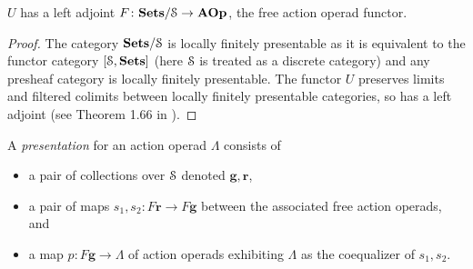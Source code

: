 \begin{cor}
$U$ has a left adjoint $F \colon \mathbf{Sets}/\mathcal{S} \rightarrow \mathbf{AOp}$, the free action operad functor.
\end{cor}
\begin{proof}
The category $\mathbf{Sets}/\mathcal{S}$ is locally finitely presentable as it is equivalent to the functor category $[\mathcal{S}, \mathbf{Sets}]$ (here $\mathcal{S}$ is treated as a discrete category) and any presheaf category is locally finitely presentable. The functor $U$ preserves limits and filtered colimits between locally finitely presentable categories, so has a left adjoint (see Theorem 1.66 in \cite{ar}).
\end{proof}

\begin{Defi}
  A \textit{presentation} for an action operad $\Lambda$ consists of
  \begin{itemize}
    \item a pair of collections over $\mathcal{S}$ denoted $\mathbf{g}, \mathbf{r}$,
    \item a pair of maps $s_{1}, s_{2} \colon F\mathbf{r} \rightarrow F\mathbf{g}$ between the associated free action operads, and
    \item a map $p \colon F\mathbf{g} \rightarrow \Lambda$ of action operads exhibiting $\Lambda$ as the coequalizer of $s_{1},s_{2}$.
  \end{itemize}
\end{Defi}







